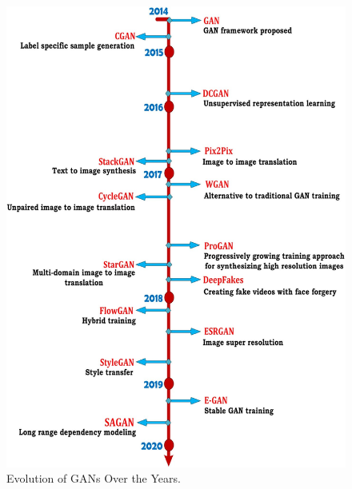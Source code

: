 \begin{figure}
        \begin{center}
 	    \includegraphics[scale=0.25]{images/relatedWorks/GANEvolution.jpg}
	    \caption[Evolution of \acp{GAN} Over the Years.]{Evolution of \acp{GAN} Over the Years\cite{PavanKumar.2021}.}
	    \label{fig:GANEvolution}
	    \end{center}
\end{figure}




